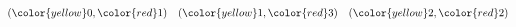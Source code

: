 \documentclass[preview]{standalone}
\begin{document}
\begin{align*}
(\color{yellow} 0, \color{red} 1) \quad(\color{yellow} 1, \color{red} 3) \quad(\color{yellow} 2, \color{red} 2)
\end{align*}
\end{document}
